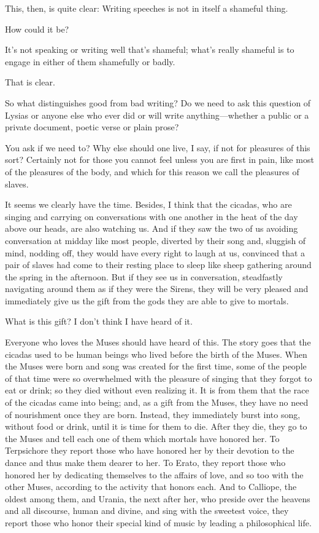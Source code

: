 \saysocrates This, then, is quite clear: Writing speeches is not in itself
a shameful thing.

\sayphaedrus How could it be?

\saysocrates It's not speaking or writing well that's shameful; what's
really shameful is to engage in either of them shamefully or badly.

\sayphaedrus That is clear.

\saysocrates So what distinguishes good from bad writing? Do we need to ask
this question of Lysias or anyone else who ever did or will write
anything---whether a public or a private document, poetic verse or plain
prose?

\sayphaedrus You ask if we need to? Why else should one live, I say, if 
not for pleasures of this sort? Certainly not for those you
cannot feel unless you are first in pain, like most of the pleasures of
the body, and which for this reason we call the pleasures of slaves.

\saysocrates It seems we clearly have the time. Besides, I think that the
cicadas, who are singing and carrying on conversations with one another 
in the heat of the day above our heads, are also
watching us. And if they saw the two of us avoiding conversation at
midday like most people, diverted by their song and, sluggish of mind,
nodding off, they would have every right to laugh at us, convinced that
a pair of slaves had come to their resting place to sleep like sheep
gathering around the spring in the afternoon. But if they see us in
conversation, steadfastly navigating around them as if they were
the Sirens, they will be very pleased and immediately give us the gift
from the gods they are able to give to mortals.

\sayphaedrus What is this gift? I don't think I have heard of it.

\saysocrates Everyone who loves the Muses should have heard of this. The
story goes that the cicadas used to be human beings who lived before the
birth of the Muses. When the Muses were born and song was created for
the first time, some of the people of that time were so overwhelmed 
with the pleasure of singing that they forgot to eat or drink;
so they died without even realizing it. It is from them that the race of
the cicadas came into being; and, as a gift from the Muses, they have no
need of nourishment once they are born. Instead, they immediately burst
into song, without food or drink, until it is time for them to die.
After they die, they go to the Muses and tell each one of them which
mortals have honored her. To Terpsichore they report those who
have honored her by their devotion to the dance and thus make them
dearer to her. To Erato, they report those who honored her by dedicating
themselves to the affairs of love, and so too with the other Muses,
according to the activity that honors each. And to Calliope, the oldest
among them, and Urania, the next after her, who preside over the heavens
and all discourse, human and divine, and sing with the sweetest voice,
they report those who honor their special kind of music by leading a
philosophical life.

